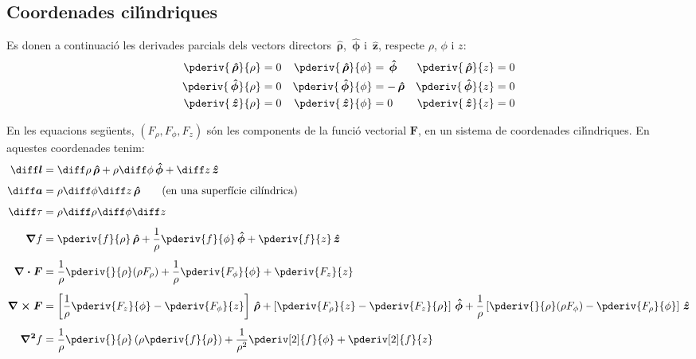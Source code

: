 \documentclass[catalan,a4paper,twoside,11pt]{article}
\begin{document}
\subsection{Coordenades cil\'{\i}ndriques}

\renewcommand{\va}{\ensuremath{\,\boldsymbol{\hat{\rho}}}}
\renewcommand{\vb}{\ensuremath{\,\boldsymbol{\hat{\phi}}}}
\renewcommand{\vc}{\ensuremath{\,\boldsymbol{\hat{z}}}}

Es donen a continuaci\'{o} les derivades parcials dels vectors directors $\va$, $\vb$ i $\vc$, respecte $\rho$, $\phi$ i $z$:
\begin{subequations}
\begin{align}
   \pderiv{\va}{\rho} &= 0 & \pderiv{\va}{\phi} &= \vb  & \pderiv{\va}{z} &= 0 \\
   \pderiv{\vb}{\rho} &= 0 & \pderiv{\vb}{\phi} &= -\va & \pderiv{\vb}{z} &= 0 \\
   \pderiv{\vc}{\rho} &= 0 & \pderiv{\vc}{\phi} &= 0    & \pderiv{\vc}{z} &= 0
\end{align}
\end{subequations}

En les equacions seg\"{u}ents, $(F_\rho,F_\phi,F_z)$  s\'{o}n les
components de la funci\'{o} vectorial   $\boldsymbol{F}$, en un sistema de
coordenades cil\'{\i}ndriques. En aquestes coordenades tenim:
\begin{align}
    \boldsymbol{\diff l} &= \diff \rho \va + \rho\diff \phi \vb + \diff z \vc\\[1ex]
    \boldsymbol{\diff a} &= \rho\diff \phi \diff z \va\qquad\text{(en una superf\'{\i}cie cil\'{\i}ndrica)}\\[1ex]
    \diff\tau &= \rho \diff \rho \diff \phi \diff z\\[1ex]
    \boldsymbol{\nabla}f &= \pderiv{f}{\rho}\va + \frac{1}{\rho}\pderiv{f}{\phi}\vb
    + \pderiv{f}{z}\vc\\[1ex]
    \boldsymbol{\nabla\cdot F} &= \frac{1}{\rho}\pderiv{}{\rho}(\rho F_\rho) +
    \frac{1}{\rho}\pderiv{F_\phi}{\phi}+ \pderiv{F_z}{z}\\[1ex]
    \boldsymbol{\nabla\times F} &= \left[\frac{1}{\rho}\pderiv{F_z}{\phi}-
    \pderiv{F_\phi}{z}\right]\va +
    \left[\pderiv{F_\rho}{z}-\pderiv{F_z}{\rho}\right]\vb +
    \frac{1}{\rho}\left[\pderiv{}{\rho}(\rho F_\phi)-\pderiv{F_\rho}{\phi}\right]\vc\\[1ex]
    \boldsymbol{\nabla^2}f &= \frac{1}{\rho}\pderiv{}{\rho}\left(\rho\pderiv{f}{\rho}
    \right)
    + \frac{1}{\rho^2}\pderiv[2]{f}{\phi}+ \pderiv[2]{f}{z}
\end{align}
\end{document}
